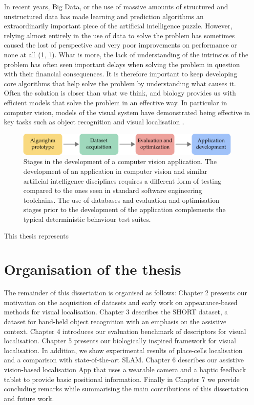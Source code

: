 In recent years, Big Data, or the use of massive amounts of structured and unstructured data has made learning and prediction algorithms an extraordinarily important piece of the artificial intelligence puzzle. However, relying almost entirely in the use of data to solve the problem has sometimes caused the lost of perspective and very poor improvements on performance or none at all (\ref{}, \ref{}). What is more, the lack of understanding of the intrinsics of the problem has often seen important delays when solving the problem in question with their financial consequences. It is therefore important to keep developing core algorithms that help solve the problem by understanding what causes it. Often the solution is closer than what we think, and biology provides us with efficient models that solve the problem in an effective way. In particular in computer vision, models of the visual system have demonstrated being effective in key tasks such as object recognition and visual localisation \cite{lowe2004distinctive,milford2004ratslam}. 


\begin{figure}
\centering
\includegraphics[width=\linewidth]{gfx/Chapter01/cv_dev_pipeline.pdf}
\caption{Stages in the development of a computer vision application. The development of an application in computer vision and similar artificial intelligence disciplines requires a different form of testing compared to the ones seen in standard software engineering toolchains. The use of databases and evaluation and optimisation stages prior to the development of the application complements the typical deterministic behaviour test suites.}
\label{fig:cv_dev_pipeline}
\end{figure}


This thesis represents 

\section{Organisation of the thesis}

The remainder of this dissertation is organised as follows: Chapter 2 presents our motivation on the acquisition of datasets and early work on appearance-based methods for visual localisation. Chapter 3 describes the SHORT dataset, a dataset for hand-held object recognition with an emphasis on the assistive context. Chapter 4 introduces our evaluation benchmark of descriptors for visual localisation. Chapter 5 presents our biologically inspired framework for visual localisation. In addition, we show experimental results of place-cells localisation  and a comparison with state-of-the-art SLAM. Chapter 6 describes our assistive vision-based localisation App that uses a wearable camera and a haptic feedback tablet to provide basic positional information. Finally in Chapter 7 we provide concluding remarks while summarising the main contributions of this dissertation and future work.


